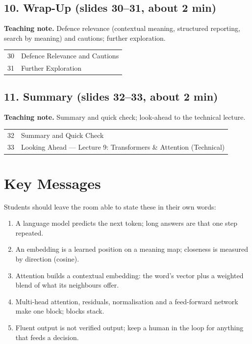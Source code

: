 \documentclass[11pt]{article}
\begin{document}
\subsection{10. Wrap-Up \normalfont\small\color{GreyN}(slides 30--31, about 2 min)}

\textbf{Teaching note.} Defence relevance (contextual meaning, structured reporting, search by meaning) and cautions; further exploration.

\begin{center}\small\renewcommand{\arraystretch}{1.1}\begin{tabularx}{\textwidth}{@{}r X@{}}30 & Defence Relevance and Cautions\\
31 & Further Exploration\\\end{tabularx}\end{center}

\subsection{11. Summary \normalfont\small\color{GreyN}(slides 32--33, about 2 min)}

\textbf{Teaching note.} Summary and quick check; look-ahead to the technical lecture.

\begin{center}\small\renewcommand{\arraystretch}{1.1}\begin{tabularx}{\textwidth}{@{}r X@{}}32 & Summary and Quick Check\\
33 & Looking Ahead --- Lecture 9: Transformers \& Attention (Technical)\\\end{tabularx}\end{center}

\section{Key Messages}Students should leave the room able to state these in their own words:\begin{keypoint}\begin{enumerate}\item A language model predicts the next token; long answers are that one step repeated.\item An embedding is a learned position on a meaning map; closeness is measured by direction (cosine).\item Attention builds a contextual embedding: the word's vector plus a weighted blend of what its neighbours offer.\item Multi-head attention, residuals, normalisation and a feed-forward network make one block; blocks stack.\item Fluent output is not verified output; keep a human in the loop for anything that feeds a decision.\end{enumerate}\end{keypoint}
\end{document}
